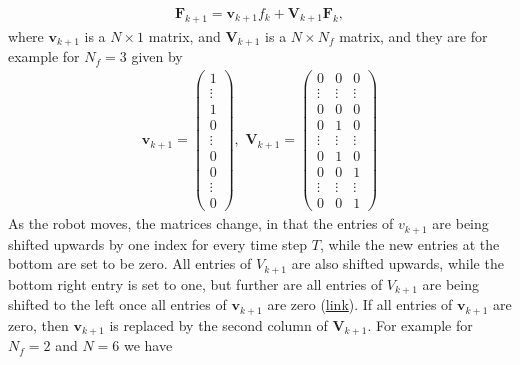\begin{align}
	\bm{F}_{k+1} = \bm{v}_{k+1}f_k + \bm{V}_{k+1}\bm{F}_k,
\end{align}
where $\bm{v}_{k+1}$ is a $N\times1$ matrix, and $\bm{V}_{k+1}$ is a $N\times N_f$ matrix, and they are for example for $N_f = 3$ given by
\begin{align}
	\bm{v}_{k+1} = \begin{pmatrix}
	1 \\ 
	\vdots \\
	1 \\
	0 \\
	\vdots \\
	0 \\
	0 \\
	\vdots \\
	0
	\end{pmatrix},\,\, 
	\bm{V}_{k+1} = \begin{pmatrix}
	0 & 0 & 0\\
	\vdots & \vdots & \vdots \\
	0 & 0 & 0 \\
	0 & 1 & 0 \\
	\vdots & \vdots & \vdots \\
	0 & 1 & 0 \\
	0 & 0 & 1 \\
	\vdots & \vdots & \vdots \\
	0 & 0 & 1
	\end{pmatrix}
\end{align}
As the robot moves, the matrices change, in that the entries of $v_{k+1}$ are being shifted upwards by one index for every time step $T$, while the new entries at the bottom are set to be zero. All entries of $V_{k+1}$ are also shifted upwards, while the bottom right entry is set to one, but further are all entries of $V_{k+1}$ are being shifted to the left once all entries of $\bm{v}_{k+1}$ are zero (\href{https://github.com/mhubii/nmpc_pattern_generator/blob/5a213044c927dc6aac9f7e32ce1e5fb472cd67bb/libs/pattern_generator/src/base_generator.cpp#L740}{link}). If all entries of $\bm{v}_{k+1}$ are zero, then $\bm{v}_{k+1}$ is replaced by the second column of $\bm{V}_{k+1}$. For example for $N_f = 2$ and $N=6$  we have
